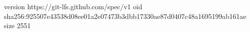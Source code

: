 version https://git-lfs.github.com/spec/v1
oid sha256:925507e43538d08ee01a2e07473b3dbb17330ae87d0407c48a1695199ab161ae
size 2551

